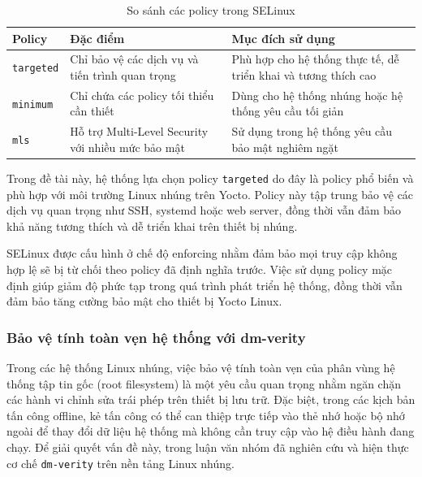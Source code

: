 \begin{table}[H]
\centering
\caption{So sánh các policy trong SELinux}
\label{tab:selinux_policy}
\begin{tabular}{|p{3cm}|p{4cm}|p{5cm}|}
\hline
\textbf{Policy} & \textbf{Đặc điểm} & \textbf{Mục đích sử dụng} \\ \hline

\texttt{targeted} & Chỉ bảo vệ các dịch vụ và tiến trình quan trọng & Phù hợp cho hệ thống thực tế, dễ triển khai và tương thích cao \\ \hline

\texttt{minimum} & Chỉ chứa các policy tối thiểu cần thiết & Dùng cho hệ thống nhúng hoặc hệ thống yêu cầu tối giản \\ \hline

\texttt{mls} & Hỗ trợ Multi-Level Security với nhiều mức bảo mật & Sử dụng trong hệ thống yêu cầu bảo mật nghiêm ngặt \\ \hline

\end{tabular}
\end{table}

Trong đề tài này, hệ thống lựa chọn policy \texttt{targeted} do đây là policy phổ biến và phù hợp với môi trường Linux nhúng trên Yocto. Policy này tập trung bảo vệ các dịch vụ quan trọng như SSH, systemd hoặc web server, đồng thời vẫn đảm bảo khả năng tương thích và dễ triển khai trên thiết bị nhúng.

SELinux được cấu hình ở chế độ enforcing nhằm đảm bảo mọi truy cập không hợp lệ sẽ bị từ chối theo policy đã định nghĩa trước. Việc sử dụng policy mặc định giúp giảm độ phức tạp trong quá trình phát triển hệ thống, đồng thời vẫn đảm bảo tăng cường bảo mật cho thiết bị Yocto Linux.
\subsubsection{Bảo vệ tính toàn vẹn hệ thống với dm-verity}

Trong các hệ thống Linux nhúng, việc bảo vệ tính toàn vẹn của phân vùng hệ thống tập tin gốc (root filesystem) là một yêu cầu quan trọng nhằm ngăn chặn các hành vi chỉnh sửa trái phép trên thiết bị lưu trữ. Đặc biệt, trong các kịch bản tấn công offline, kẻ tấn công có thể can thiệp trực tiếp vào thẻ nhớ hoặc bộ nhớ ngoài để thay đổi dữ liệu hệ thống mà không cần truy cập vào hệ điều hành đang chạy. Để giải quyết vấn đề này, trong luận văn nhóm đã nghiên cứu và hiện thực cơ chế \texttt{dm-verity} trên nền tảng Linux nhúng.

